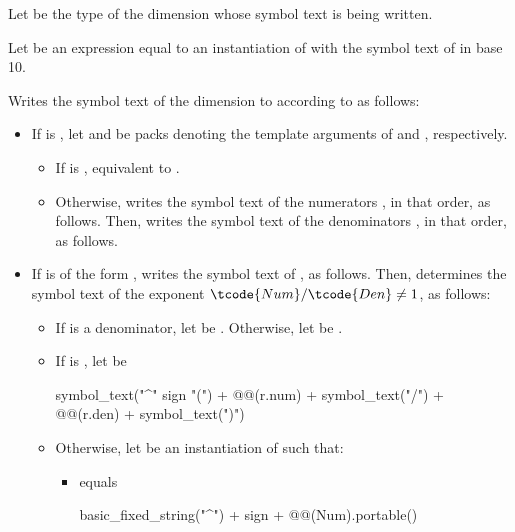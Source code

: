 \begin{itemdescr}
\pnum
Let  be the type of the dimension whose symbol text is being written.

\pnum
Let  be an expression equal to
an instantiation of  with the symbol text of  in base 10.

\pnum
\effects
Writes the symbol text of the dimension  to  according to  as follows:
\begin{itemize}
\item
If
is ,
let  and 
be packs denoting the template arguments of
 and , respectively.
\begin{itemize}
\item
If  is ,
equivalent to .
\item
Otherwise, writes the symbol text of the numerators , in that order, as follows.
Then, writes the symbol text of the denominators , in that order, as follows.
\end{itemize}
\item
If  is of the form ,
writes the symbol text of , as follows.
Then, determines the symbol text of the exponent $\tcode{Num}/\tcode{Den} \neq 1$, as follows:
\begin{itemize}
\item
If  is a denominator, let  be .
Otherwise, let  be .
\item
If  is , let  be
\begin{codeblock}
symbol_text("^" sign "(") + @@(r.num) + symbol_text("/") +
  @@(r.den) + symbol_text(")")
\end{codeblock}
\item
Otherwise, let  be an instantiation of  such that:
\begin{itemize}
\item
{} equals
\begin{codeblock}
basic_fixed_string("^") + sign + @@(Num).portable()
\end{codeblock}

\end{itemize}
\end{itemize}
\end{itemize}
\end{itemdescr}
